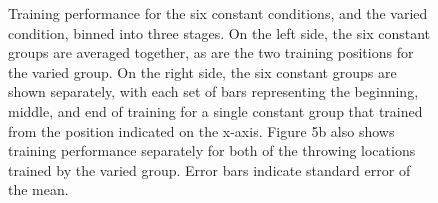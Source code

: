 \documentclass[
  12pt,
  letterpaper,
]{article}
\begin{document}
\begin{figure}


\caption{\label{fig-e2train-1}Training performance for the six constant
conditions, and the varied condition, binned into three stages. On the
left side, the six constant groups are averaged together, as are the two
training positions for the varied group. On the right side, the six
constant groups are shown separately, with each set of bars representing
the beginning, middle, and end of training for a single constant group
that trained from the position indicated on the x-axis. Figure 5b also
shows training performance separately for both of the throwing locations
trained by the varied group. Error bars indicate standard error of the
mean.}

\end{figure}%
\end{document}
